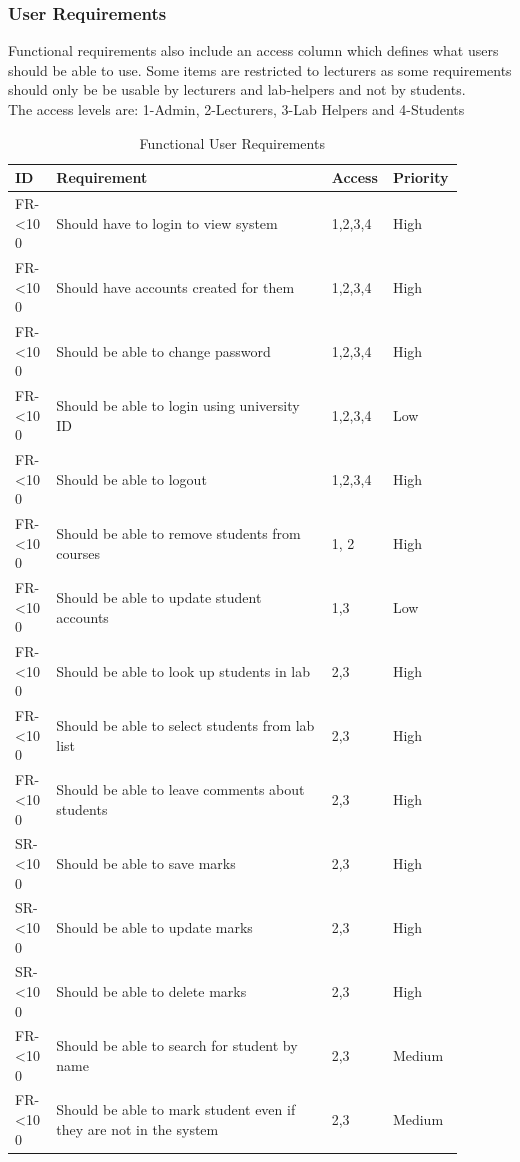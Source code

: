 \documentclass[12pt]{article}  %
\newcommand{\rid}[1]{\centering #1-\ifnum\value{requirement}<10 0\fi\arabic{requirement} \stepcounter{requirement}}
\begin{document}
\def\arraystretch{1.5}
\subsubsection{User Requirements}
Functional requirements also include an access column which defines what users should be able to use. Some items are restricted to lecturers as some requirements should only be be usable by lecturers and lab-helpers and not by students.\\
The access levels are: 1-Admin, 2-Lecturers, 3-Lab Helpers and 4-Students




\begin{spacing}{1.5}
\begin{longtable}{|p{0.09\linewidth}|p{0.6\linewidth}|p{0.1\linewidth}|
p{0.1\linewidth}|}
\caption{Functional User Requirements} \label{table:funct-user} \\
\hline


\textbf{ID} & \textbf{Requirement} & \textbf{Access} & \textbf{Priority}\\
\hline \hline


\rid{FR} & Should have to login to view system & 1,2,3,4 & High\\ \hline
\rid{FR} & Should have accounts created for them & 1,2,3,4 & High\\ \hline
\rid{FR} & Should be able to change password & 1,2,3,4 & High\\ \hline
\rid{FR} & Should be able to login using university ID & 1,2,3,4 & Low\\ \hline
\rid{FR} & Should be able to logout & 1,2,3,4 & High \\ \hline

\rid{FR} & Should be able to remove students from courses & 1, 2 & High\\ \hline
\rid{FR} & Should be able to update student accounts & 1,3 & Low \\ \hline

\rid{FR} & Should be able to look up students in lab & 2,3 & High\\ \hline
\rid{FR} & Should be able  to select students from lab list & 2,3 & High\\ \hline
\rid{FR} & Should be able to leave comments about students & 2,3 & High\\ \hline
\rid{SR} & Should be able to save marks & 2,3 & High\\ \hline
\rid{SR} & Should be able to update marks & 2,3 & High\\ \hline
\rid{SR} & Should be able to delete marks & 2,3 & High\\ \hline
\rid{FR} & Should be able to search for student by name & 2,3 & Medium\\ \hline
\rid{FR} & Should be able to mark student even if they are not in the system & 2,3 & Medium \\ \hline


\end{longtable}
\end{spacing}
\end{document}
